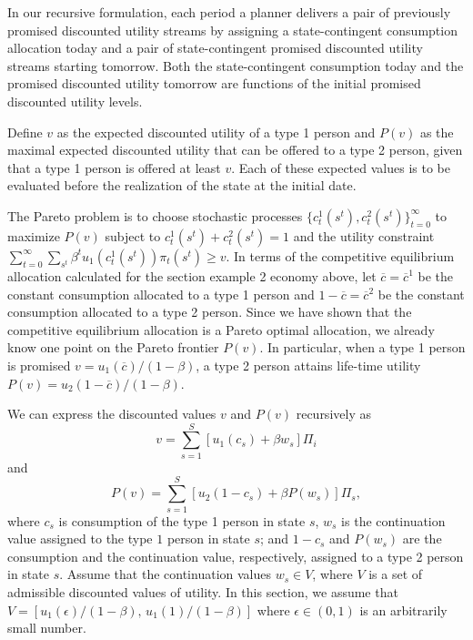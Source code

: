 In our recursive formulation, each period a planner
delivers a pair of previously promised discounted
utility streams by assigning a state-contingent
consumption allocation today and a pair of state-contingent
promised discounted utility streams starting tomorrow.
Both the state-contingent consumption  today and the promised
discounted utility tomorrow are functions of the initial
promised discounted utility levels.


  Define $v$ as  the expected discounted utility of
a type 1 person
and $P(v)$ as the maximal expected discounted utility
that can be offered to a type 2 person, given that
a type 1 person is offered at least $v$. Each of these expected values
is to be evaluated before the realization of the state at the initial
date.

The Pareto problem is to choose stochastic processes $\{c_t^1(s^t), c_t^2(s^t)\}_{t=0}^\infty$ to
 maximize
$P(v)$ subject to  $c_t^1(s^t) + c_t^2(s^t) =1$ and the utility constraint
$\sum_{t=0}^\infty \sum_{s^t} \beta^t u_1(c_t^1(s^t)) \pi_t(s^t) \geq v.$
In terms of the competitive equilibrium
allocation calculated for  the section  example 2  economy above,
let $\overline c= \overline c^1$ be the  constant consumption
allocated to a type 1 person and $1-\overline
c=\overline c^2$ be the constant consumption
allocated to a type 2 person.
Since we have shown that the competitive equilibrium allocation is
a Pareto optimal allocation, we already know one point on the
Pareto frontier $P(v)$. In particular, when a type 1 person is promised
$v= u_1(\overline c) / (1 - \beta) $, a type 2 person attains
life-time utility
$P(v) =  u_2(1-\overline c) / (1-\beta)$.

We can express the discounted values $v$  and $P(v)$ recursively
as
$$  v = \sum_{s=1}^S \left[ u_1(c_s)   +\beta w_s \right]  \Pi_i $$
and
$$ P(v) = \sum_{s=1}^S \left[ u_2(1- c_s) + \beta P(w_s) \right] \Pi_s, $$
where $c_s$ is consumption of the type 1 person in state $s$,
$w_s$ is the continuation value assigned to the type
$1$ person in state $s$; and $1-c_s$ and $P(w_s)$ are the consumption
and the continuation value, respectively, assigned to a type 2 person in state $s$.
Assume that  the continuation values $w_s \in V$, where $V$ is a set
of admissible discounted values of utility.   In this section,
 we assume
that $V = [u_1(\epsilon) / (1-\beta),\,  u_1(1) / (1 -\beta)]$ where
$\epsilon\in(0,1)$ is an arbitrarily small number.

